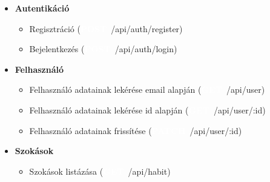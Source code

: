\documentclass[12pt]{report}
\newcommand{\httpGet}[1]{\colorbox{getColor}{\textbf{\textcolor{white}{GET}}}~#1}
\newcommand{\httpPost}[1]{\colorbox{postColor}{\textbf{\textcolor{white}{POST}}}~#1}
\newcommand{\httpPatch}[1]{\colorbox{patchColor}{\textbf{\textcolor{white}{PATCH}}}~#1}
\begin{document}
\begin{itemize}
  \item \textbf{Autentikáció}
    \begin{itemize}
      \item Regisztráció (\httpPost{/api/auth/register})
      \item Bejelentkezés (\httpPost{/api/auth/login})
    \end{itemize}
  \item \textbf{Felhasználó}
    \begin{itemize}
      \item Felhasználó adatainak lekérése email alapján (\httpGet{/api/user})
      \item Felhasználó adatainak lekérése id alapján (\httpGet{/api/user/:id})
      \item Felhasználó adatainak frissítése (\httpPatch{/api/user/:id})
    \end{itemize}
  \item \textbf{Szokások}
    \begin{itemize}
      \item Szokások listázása (\httpGet{/api/habit})


\end{itemize}
\end{itemize}
\end{document}

